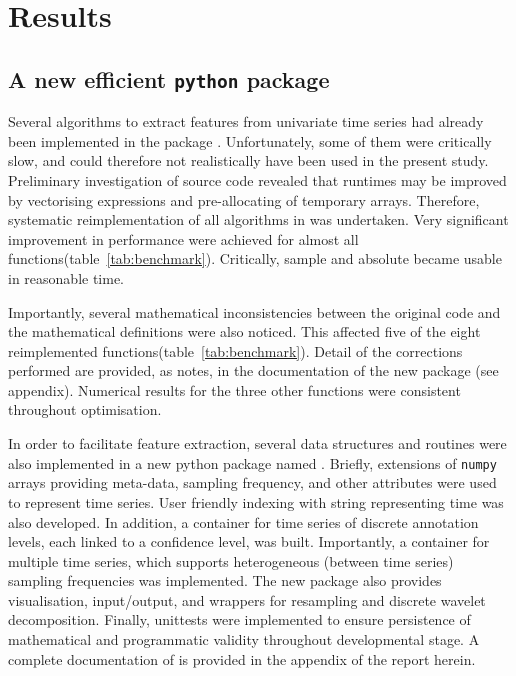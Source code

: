 \section{Results} \label{results}

\subsection{A new efficient \texttt{python} package}
Several algorithms to extract features from univariate time series had already been implemented in the \py{} package \pyeeg{}\citationneeded{}.
Unfortunately, some of them were critically slow, and could therefore not realistically have been used in the present study.
Preliminary investigation of \pyeeg{} source code revealed that runtimes may be improved by vectorising expressions and pre-allocating of temporary arrays.
Therefore, systematic reimplementation of all algorithms in \pyeeg{} was undertaken.
Very significant improvement in performance were achieved for almost all functions(table~\ref{tab:benchmark}).
Critically, sample \citationneeded{} and absolute \citationneeded{} became usable in reasonable time.


Importantly, several mathematical inconsistencies between the original code and the mathematical definitions were also noticed.
This affected five of the eight reimplemented functions(table~\ref{tab:benchmark}).
Detail of the corrections performed are provided, as notes, in the documentation of the new package (see appendix).
Numerical results for the three other functions were consistent throughout optimisation.

In order to facilitate feature extraction, several data structures and routines were also implemented
in a new python package named \pr{}.
Briefly, extensions of \texttt{numpy} arrays providing meta-data, sampling frequency, and other attributes were used to represent time series.
User friendly indexing with string representing time was also developed.
In addition, a container for time series of discrete annotation levels, each linked to a confidence level, was built.
Importantly, a container for multiple time series, which supports heterogeneous (between time series) sampling frequencies was implemented.
The new package also provides visualisation, input/output, and wrappers for resampling and discrete wavelet decomposition.
Finally, unittests were implemented to ensure persistence of mathematical and programmatic validity throughout developmental stage.
A complete documentation of \pr{} is provided in the appendix of the report herein.

